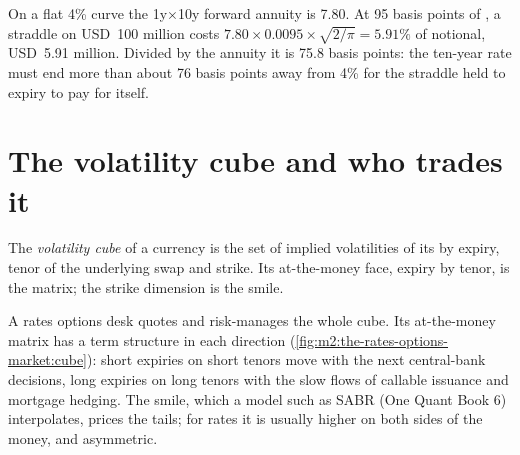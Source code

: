 \begin{example}[A straddle]\label{ex:m2:the-rates-options-market:straddle}
On a flat 4\% curve the 1y$\times$10y forward annuity is 7.80. At 95 basis
points of , a straddle on USD~100 million costs
$7.80 \times 0.0095 \times \sqrt{2/\pi} = 5.91\%$ of notional, USD~5.91 million.
Divided by the annuity it is 75.8 basis points: the ten-year rate must end
more than about 76 basis points away from 4\% for the straddle held to expiry to
pay for itself.
\end{example}

\section{The volatility cube and who trades it}

\begin{definition}\label{def:m2:the-rates-options-market:cube}
The \emph{volatility cube} of a currency is the set of
implied volatilities of its  by expiry, tenor of the underlying swap and
strike. Its at-the-money face, expiry by tenor, is the  matrix; the
strike dimension is the smile.
\end{definition}

A rates options desk quotes and risk-manages the whole cube. Its at-the-money
matrix has a term structure in each direction
(\cref{fig:m2:the-rates-options-market:cube}): short expiries on short tenors
move with the next central-bank decisions, long expiries on long tenors with
the slow flows of callable issuance and mortgage hedging. The smile, which a
model such as SABR (One Quant Book 6) interpolates, prices the tails; for rates
it is usually higher on both sides of the money, and asymmetric.

